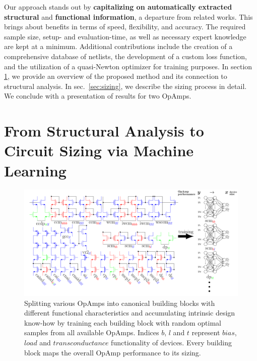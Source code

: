 \documentclass[conference]{IEEEtran}
\begin{document}
	\newline
	Our approach stands out by \textbf{capitalizing on automatically extracted structural} and \textbf{functional information}, a departure from related works. This brings about benefits in terms of speed, flexibility, and accuracy. The required sample size, setup- and evaluation-time, as well as necessary expert knowledge are kept at a minimum. Additional contributions include the creation of a comprehensive database of netlists, the development of a custom loss function, and the utilization of a quasi-Newton optimizer for training purposes.
\newline
	 In section \ref{sec:intro2}, we provide an overview of the proposed method and its connection to structural analysis. 
	 In sec.~\ref{sec:sizing}, we describe the sizing process in detail. We conclude with a presentation of results for two OpAmps.
	 
	 	
 	\section{From Structural Analysis to Circuit Sizing via Machine Learning}\label{sec:intro2}
	\begin{figure}[h]
		\centering
        \includegraphics[width=\linewidth]{figures/struct_overview_incl_partition}
		\setlength{\abovecaptionskip}{0ex}%
		\setlength{\belowcaptionskip}{-2ex}%
		\caption{Splitting various OpAmps into canonical building blocks with different functional characteristics and accumulating intrinsic design know-how by training each building block with random optimal samples from all available OpAmps. Indices {\color{red} $b$}, {\color{blue} $l$} and {\color{green} $t$} represent {\color{red}$bias$}, {\color{blue}$load$} and {\color{green}$transconductance$} functionality of devices. Every building block maps the overall OpAmp performance to its sizing.}
		\label{fig:overview-structure}
	\end{figure}
	\setlength{\abovecaptionskip}{1ex}%
	\setlength{\belowcaptionskip}{-3ex}%
\end{document}
